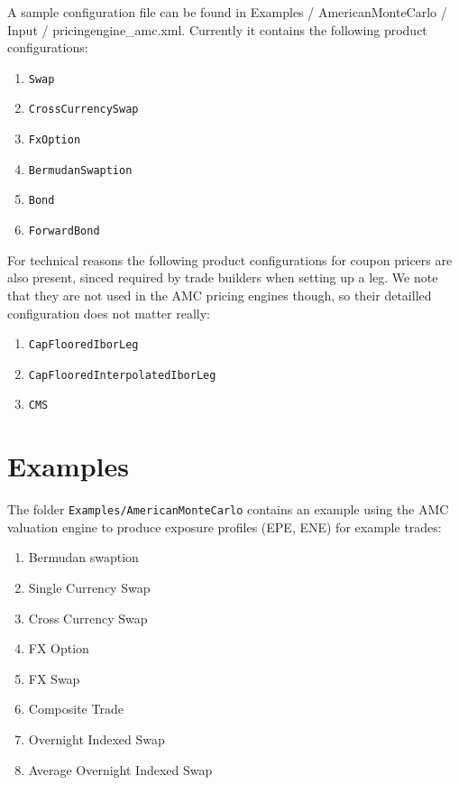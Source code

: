 \documentclass[12pt, a4paper]{article}
\begin{document}
A sample configuration file can be found in Examples / AmericanMonteCarlo / Input / pricingengine\_amc.xml. Currently it
contains the following product configurations:

\begin{enumerate}
\item \verb+Swap+
\item \verb+CrossCurrencySwap+
\item \verb+FxOption+
\item \verb+BermudanSwaption+
\item \verb+Bond+
\item \verb+ForwardBond+
\end{enumerate}

For technical reasons the following product configurations for coupon pricers are also present, sinced required by trade
builders when setting up a leg. We note that they are not used in the AMC pricing engines though, so their detailled
configuration does not matter really:

\begin{enumerate}
\item \verb+CapFlooredIborLeg+
\item \verb+CapFlooredInterpolatedIborLeg+
\item \verb+CMS+  
\end{enumerate}

\section{Examples}

The folder \verb+Examples/AmericanMonteCarlo+ contains an example using the AMC valuation engine to produce exposure
profiles (EPE, ENE) for example trades:

\begin{enumerate}
\item Bermudan swaption
\item Single Currency Swap
\item Cross Currency Swap
\item FX Option
\item FX Swap
\item Composite Trade
\item Overnight Indexed Swap
\item Average Overnight Indexed Swap
\end{enumerate}
\end{document}
